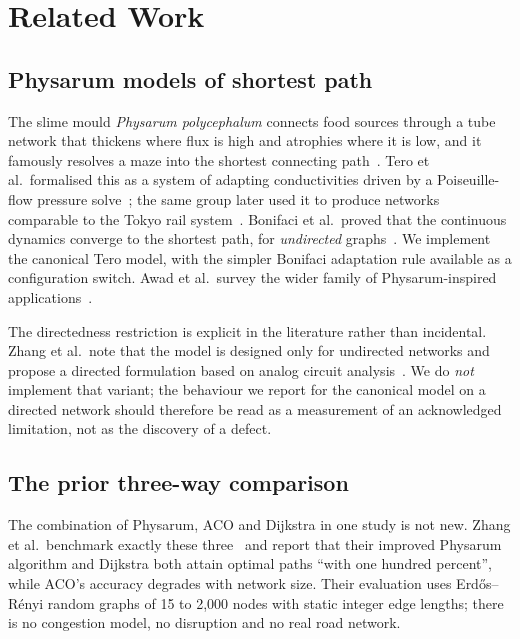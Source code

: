 \section{Related Work}

\subsection{Physarum models of shortest path}

The slime mould \emph{Physarum polycephalum} connects food sources through a
tube network that thickens where flux is high and atrophies where it is
low, and it famously resolves a maze into the shortest connecting
path~\cite{nakagaki2000maze}. Tero et al.\ formalised this as a system of
adapting conductivities driven by a Poiseuille-flow pressure
solve~\cite{tero2007mathematical}; the same group later used it to produce
networks comparable to the Tokyo rail system~\cite{tero2010rules}. Bonifaci
et al.\ proved that the continuous dynamics converge to the shortest path,
for \emph{undirected} graphs~\cite{bonifaci2012physarum}. We implement the
canonical Tero model, with the simpler Bonifaci adaptation rule available as
a configuration switch. Awad et al.\ survey the wider family of
Physarum-inspired applications~\cite{awad2022survey}.

The directedness restriction is explicit in the literature rather than
incidental. Zhang et al.\ note that the model is designed only for
undirected networks and propose a directed formulation based on analog
circuit analysis~\cite{zhang2014directed}. We do \emph{not} implement that
variant; the behaviour we report for the canonical model on a directed
network should therefore be read as a measurement of an acknowledged
limitation, not as the discovery of a defect.

\subsection{The prior three-way comparison}

The combination of Physarum, ACO and Dijkstra in one study is not new.
Zhang et al.\ benchmark exactly these three~\cite{zhang2014improved} and
report that their improved Physarum algorithm and Dijkstra both attain
optimal paths ``with one hundred percent'', while ACO's accuracy degrades
with network size. Their evaluation uses Erd\H{o}s--R\'enyi random graphs of
15 to 2{,}000 nodes with static integer edge lengths; there is no congestion
model, no disruption and no real road network.

